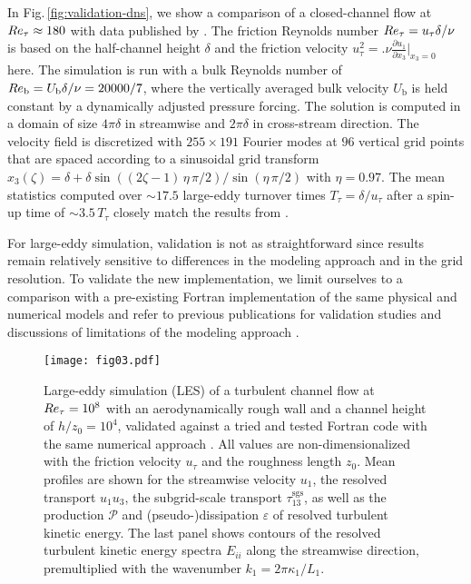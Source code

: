 \documentclass[gmd, manuscript]{copernicus}
\begin{document}
In Fig.\,\ref{fig:validation-dns}, we show a comparison of a closed-channel flow at \(R \mkern -.2mue_\tau \approx 180\) with data published by \citet{LeeMoser2015}.
The friction Reynolds number \(R \mkern -.2mue_\tau = u_\tau \delta/\nu\) is based on the half-channel height \(\delta\) and the friction velocity \(u_\tau^2 = \bigl. \nu \frac{\partial u_1}{\partial x_3} \bigr|_{x_3=0}\) here.
The simulation is run with a bulk Reynolds number of \(R \mkern -.2mue_\mathrm{b} = U_\mathrm{b} \delta / \nu = 20000/7\), where the vertically averaged bulk velocity \(U_\mathrm{b}\) is held constant by a dynamically adjusted pressure forcing.
The solution is computed in a domain of size \(4 \pi \delta\) in streamwise and \(2 \pi \delta\) in cross-stream direction.
The velocity field is discretized with \(255 \times 191\) Fourier modes at \(96\) vertical grid points that are spaced according to a sinusoidal grid transform
\(x_3(\zeta) = \delta + \delta \sin\left((2\zeta-1)\,\eta\,\pi/2\right) / \sin(\eta\,\pi/2)\)
with \(\eta = 0.97\).
The mean statistics computed over \({\sim}17.5\) large-eddy turnover times \(T_\tau = \delta / u_\tau\) after a spin-up time of \({\sim}3.5\,T_\tau\) closely match the results from \citet{LeeMoser2015}.

For large-eddy simulation, validation is not as straightforward since results remain relatively sensitive to differences in the modeling approach and in the grid resolution.
To validate the new implementation, we limit ourselves to a comparison with a pre-existing Fortran implementation of the same physical and numerical models \citep{Giometto+2017a} and refer to previous publications for validation studies and discussions of limitations of the modeling approach \citep{PorteAgelMeneveauParlange2000, Yue+2007a, Yue+2008, Giometto+2016}.

\begin{figure*}[!t]%
  \centering
  \texttt{[image: fig03.pdf]}
  \caption{
    Large-eddy simulation (LES) of a turbulent channel flow at $R \mkern -.2mue_\tau=10^8$ with an aerodynamically rough wall and a channel height of $h/z_0 = 10^4$, validated against a tried and tested Fortran code with the same numerical approach \citep{Giometto+2017a}.
    All values are non-dimensionalized with the friction velocity $u_\tau$ and the roughness length $z_0$.
    Mean profiles are shown for the streamwise velocity $u_1$, the resolved transport $u_1 u_3$, the subgrid-scale transport $\tau_{13}^\mathrm{sgs}$, as well as the production $\mathcal{P}$ and (pseudo-)dissipation $\varepsilon$ of resolved turbulent kinetic energy.
    The last panel shows contours of the resolved turbulent kinetic energy spectra $E_{ii}$ along the streamwise direction, premultiplied with the wavenumber $k_1 = 2\pi \kappa_1/L_1$.
  }\label{fig:validation-les}
\end{figure*}
\end{document}
